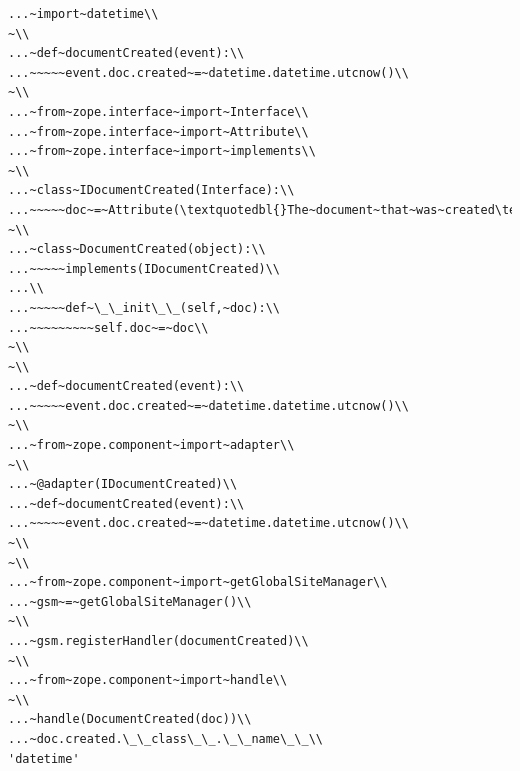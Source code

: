 \documentclass[a4paper,openany,twoside,draft]{book}
\begin{document}
\begin{verbatim}
...~import~datetime\\
~\\
...~def~documentCreated(event):\\
...~~~~~event.doc.created~=~datetime.datetime.utcnow()\\
~\\
...~from~zope.interface~import~Interface\\
...~from~zope.interface~import~Attribute\\
...~from~zope.interface~import~implements\\
~\\
...~class~IDocumentCreated(Interface):\\
...~~~~~doc~=~Attribute(\textquotedbl{}The~document~that~was~created\textquotedbl{})\\
~\\
...~class~DocumentCreated(object):\\
...~~~~~implements(IDocumentCreated)\\
...\\
...~~~~~def~\_\_init\_\_(self,~doc):\\
...~~~~~~~~~self.doc~=~doc\\
~\\
~\\
...~def~documentCreated(event):\\
...~~~~~event.doc.created~=~datetime.datetime.utcnow()\\
~\\
...~from~zope.component~import~adapter\\
~\\
...~@adapter(IDocumentCreated)\\
...~def~documentCreated(event):\\
...~~~~~event.doc.created~=~datetime.datetime.utcnow()\\
~\\
~\\
...~from~zope.component~import~getGlobalSiteManager\\
...~gsm~=~getGlobalSiteManager()\\
~\\
...~gsm.registerHandler(documentCreated)\\
~\\
...~from~zope.component~import~handle\\
~\\
...~handle(DocumentCreated(doc))\\
...~doc.created.\_\_class\_\_.\_\_name\_\_\\
'datetime'
\end{verbatim}
\end{document}
